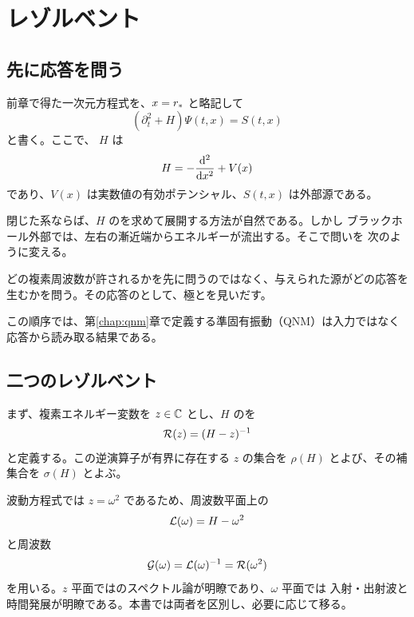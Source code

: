 \chapter{レゾルベント}
\label{chap:resolvent}

\section{先に応答を問う}

前章で得た一次元方程式を、$x=r_*$ と略記して
\begin{equation}
\left(
\partial_t^2+H
\right)\Psi(t,x)
=
S(t,x)
\label{eq:wave_H_form}
\end{equation}
と書く。ここで、 $H$ は
\begin{equation}
H
=
-\frac{\mathrm{d}^2}{\mathrm{d} x^2}
+V(x)
\label{eq:H_definition}
\end{equation}
であり、$V(x)$ は実数値の有効ポテンシャル、$S(t,x)$ は外部源である。

閉じた系ならば、$H$ のを求めて展開する方法が自然である。しかし
ブラックホール外部では、左右の漸近端からエネルギーが流出する。そこで問いを
次のように変える。

\begin{principlebox}
どの複素周波数が許されるかを先に問うのではなく、与えられた源がどの応答を
生むかを問う。その応答のとして、極とを見いだす。
\end{principlebox}

この順序では、第\ref{chap:qnm}章で定義する準固有振動（QNM）は入力ではなく
応答から読み取る結果である。

\section{二つのレゾルベント}

まず、複素エネルギー変数を $z\in\mathbb{C}$ とし、$H$ のを
\begin{equation}
\mathcal{R}(z)
=
(H-z)^{-1}
\label{eq:energy_resolvent}
\end{equation}
と定義する。この逆演算子が有界に存在する $z$ の集合を
$\rho(H)$ とよび、その補集合を $\sigma(H)$ とよぶ。

波動方程式では $z=\omega^2$ であるため、周波数平面上の
\begin{equation}
\mathcal{L}(\omega)
=
H-\omega^2
\label{eq:operator_pencil}
\end{equation}
と周波数 
\begin{equation}
\mathcal{G}(\omega)
=
\mathcal{L}(\omega)^{-1}
=
\mathcal{R}(\omega^2)
\label{eq:frequency_green_operator}
\end{equation}
を用いる。$z$ 平面ではのスペクトル論が明瞭であり、$\omega$ 平面では
入射・出射波と時間発展が明瞭である。本書では両者を区別し、必要に応じて移る。

